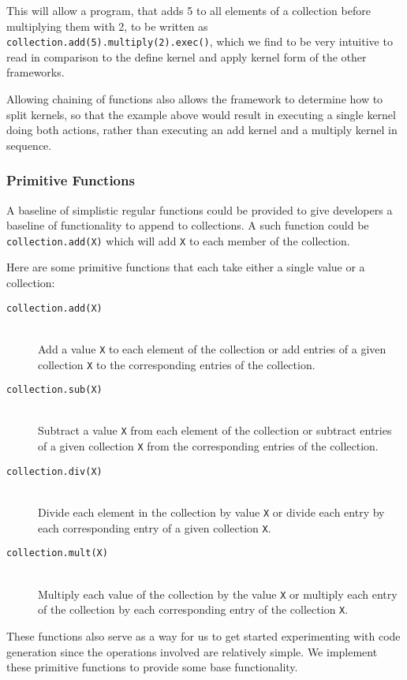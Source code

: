 This will allow a program, that adds 5 to all elements of a collection before multiplying them with 2, to be written as \texttt{collection.add(5).multiply(2).exec()}, which we find to be very intuitive to read in comparison to the define kernel and apply kernel form of the other frameworks.

Allowing chaining of functions also allows the framework to determine how to split kernels, so that the example above would result in executing a single kernel doing both actions, rather than executing an add kernel and a multiply kernel in sequence.

\subsubsection{Primitive Functions}
A baseline of simplistic regular functions could be provided to give developers a baseline of functionality to append to collections. A such function could be \texttt{collection.add(X)} which will add \texttt{X} to each member of the collection. 

Here are some primitive functions that each take either a single value or a collection: 
\begin{description}
\item[\texttt{collection.add(X)}]\hfill\\
Add a value \texttt{X} to each element of the collection or add entries of a given collection \texttt{X} to the corresponding entries of the collection.
\item[\texttt{collection.sub(X)}]\hfill\\
Subtract a value \texttt{X} from each element of the collection or subtract entries of a given collection \texttt{X} from the corresponding entries of the collection.
\item[\texttt{collection.div(X)}]\hfill\\
Divide each element in the collection by value \texttt{X} or divide each entry by each corresponding entry of a given collection \texttt{X}.
\item[\texttt{collection.mult(X)}]\hfill\\
Multiply each value of the collection by the value \texttt{X} or multiply each entry of the collection by each corresponding entry of the collection \texttt{X}.
\end{description}

These functions also serve as a way for us to get started experimenting with code generation since the operations involved are relatively simple. We implement these primitive functions to provide some base functionality.

